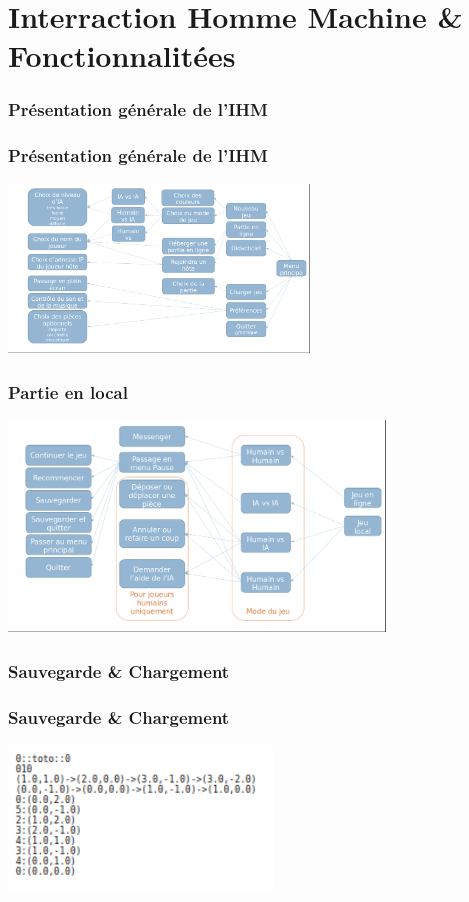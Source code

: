 \documentclass{beamer}
\begin{document}
\section{Interraction Homme Machine \& Fonctionnalit\'ees}%
\begin{frame}
\end{frame}\begin{frame}
    \frametitle{Pr\'esentation g\'en\'erale de l'IHM}
\end{frame}
    \begin{frame}
        \frametitle{Pr\'esentation g\'en\'erale de l'IHM}
        \includegraphics[width=8cm]{general.png}
    \end{frame}
    \begin{frame}
        \frametitle{Partie en local}
        \includegraphics[width=10cm]{deroulementPartie.png}
    \end{frame}
    \begin{frame}
      \frametitle{Sauvegarde \& Chargement}
    \end{frame}
    \begin{frame}
      \frametitle{Sauvegarde \& Chargement}
      \includegraphics[width=7cm]{./charge.png}
    \end{frame}
\end{document}
